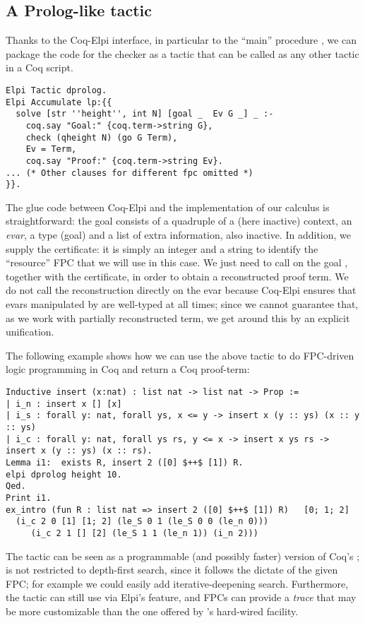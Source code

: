 \subsection{A Prolog-like tactic}

Thanks to the Coq-Elpi interface, in particular to the ``main''
procedure , we can package the \lP code for the checker
as a tactic that can be called as any other tactic in a Coq script.

\begin{lstlisting}[deletekeywords={goal}]
Elpi Tactic dprolog.
Elpi Accumulate lp:{{
  solve [str ''height'', int N] [goal _  Ev G _] _ :-
    coq.say "Goal:" {coq.term->string G},
    check (qheight N) (go G Term),
    Ev = Term,
    coq.say "Proof:" {coq.term->string Ev}.
... (* Other clauses for different fpc omitted *)
}}.
\end{lstlisting}

The glue code between Coq-Elpi and the implementation of our calculus
is straightforward: the goal consists of a quadruple of a (here
inactive) context, an \emph{evar}, a type (goal) and a list of extra
information, also inactive. In addition, we supply the certificate: it
is simply an integer and a string to identify the ``resource'' FPC that we
will use in this case. We just need to call  on the goal  ,
together with the certificate, in order to obtain a reconstructed
proof term. We do not call the reconstruction directly on the evar
because Coq-Elpi ensures that evars manipulated by \lP are well-typed
at all times; since we cannot guarantee that, as we work with
partially reconstructed term, we get around this by an explicit
unification.

The following
example shows how we can use the above tactic to do FPC-driven logic
programming in Coq and return a Coq proof-term:
\begin{lstlisting}[]
Inductive insert (x:nat) : list nat -> list nat -> Prop :=
| i_n : insert x [] [x]
| i_s : forall y: nat, forall ys, x <= y -> insert x (y :: ys) (x :: y :: ys)
| i_c : forall y: nat, forall ys rs, y <= x -> insert x ys rs -> insert x (y :: ys) (x :: rs).
Lemma i1:  exists R, insert 2 ([0] $++$ [1]) R.
elpi dprolog height 10.
Qed.
Print i1.
ex_intro (fun R : list nat => insert 2 ([0] $++$ [1]) R)   [0; 1; 2]
  (i_c 2 0 [1] [1; 2] (le_S 0 1 (le_S 0 0 (le_n 0)))
	 (i_c 2 1 [] [2] (le_S 1 1 (le_n 1)) (i_n 2)))
\end{lstlisting}

The  tactic can be seen as a programmable (and possibly
faster) version of Coq's %
; %
  is not restricted to depth-first search, since
it follows the dictate of the given FPC; for example we could easily add
iterative-deepening search. Furthermore, the tactic can still use
 via Elpi's  feature, and FPCs can provide a
\emph{trace} that may be more customizable than the one offered by 
's hard-wired  facility. 

